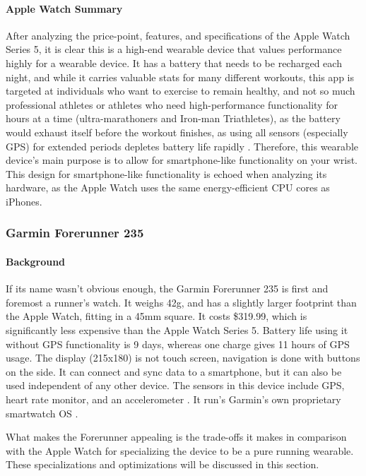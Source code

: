 \paragraph{Apple Watch Summary}
After analyzing the price-point, features, and specifications of the Apple Watch Series 5, it is clear
this is a high-end wearable device that values performance highly for a wearable device. It has a battery
that needs to be recharged each night, and while it carries valuable stats for many different workouts,
this app is targeted at individuals who want to exercise to remain healthy, and not so much professional
athletes or athletes who need high-performance functionality for hours at a time (ultra-marathoners and
Iron-man Triathletes), as the battery would exhaust itself before the workout finishes, as using all sensors
(especially GPS) for extended periods depletes battery life rapidly \cite{apple_battery}. Therefore, this
wearable device's main purpose is to allow for smartphone-like functionality on your wrist. This design
for smartphone-like functionality is echoed when analyzing its hardware, as the Apple Watch
uses the same energy-efficient CPU cores as iPhones.

\subsubsection{Garmin Forerunner 235}
\paragraph{Background}
If its name wasn't obvious enough, the Garmin Forerunner 235 is first and foremost a runner's
watch. It weighs 42g, and has a slightly larger footprint than the Apple Watch, fitting in a 45mm square.
It costs \$319.99, which is significantly less expensive than the Apple Watch Series 5. Battery life using
it without GPS functionality is 9 days, whereas one charge gives 11 hours of GPS usage. The display (215x180)
is not touch screen, navigation is done with buttons on the side. It can connect and 
sync data to a smartphone, but it can also be used independent of any other device. The sensors 
in this device include GPS, heart rate monitor, and an accelerometer \cite{garmin_price}. 
It run's Garmin's own proprietary smartwatch OS \cite{garmin_specs}.

What makes the Forerunner appealing is the trade-offs it makes in comparison with the Apple Watch
for specializing the device to be a pure running wearable. These specializations and optimizations will
be discussed in this section.

